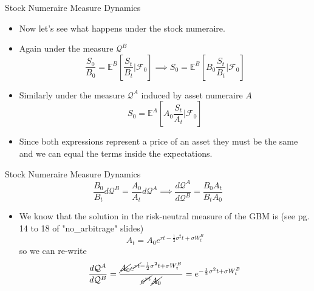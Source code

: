 \documentclass{beamer}
\begin{document}
\begin{frame}{Stock Numeraire Measure Dynamics}
	\begin{itemize}
	\item Now let's see what happens under the stock numeraire.
	\item Again under the measure $\mathcal{Q}^B$
	\begin{equation*}
	\frac{S_0}{B_0} = \mathbb{E}^B\left[\frac{S_t}{B_t}\bigg|\mathcal{F}_0\right] \implies
	S_0 = \mathbb{E}^B\left[B_0\frac{S_t}{B_t}\bigg|\mathcal{F}_0\right]
	\end{equation*}
	\item Similarly under the measure $\mathcal{Q}^A$ induced by asset numeraire $A$
	\begin{equation*}
	S_0 = \mathbb{E}^A\left[A_0\frac{S_t}{A_t}\bigg|\mathcal{F}_0\right]
	\end{equation*}
	\item Since both expressions represent a price of an asset they must be the same and we can equal the terms inside the expectations.
\end{itemize}
\end{frame}

\begin{frame}{Stock Numeraire Measure Dynamics}
	\begin{equation*}
	\frac{B_0}{B_t}d\mathcal{Q}^B = \frac{A_0}{A_t}d\mathcal{Q}^A\implies \frac{d\mathcal{Q}^A}{d\mathcal{Q}^B}=\frac{B_0A_t}{B_tA_0}
	\end{equation*}
	\begin{itemize}
	\item We know that the solution in the risk-neutral measure of the GBM is (see pg. 14 to 18 of "no\_arbitrage" slides)
	\begin{equation*} 
	A_t = A_0 e^{rt-\frac{1}{2}\sigma^2 t + \sigma W^B_t}
	\end{equation*}
	so we can re-write
	\begin{equation*}
	\frac{d\mathcal{Q}^A}{d\mathcal{Q}^B}=\frac{\cancel{A_0}e^{\cancel{rt}-\frac{1}{2}\sigma^2 t + \sigma W^B_t}}{\cancel{e^{rt}}\cancel{A_0}}=e^{-\frac{1}{2}\sigma^2 t + \sigma W^B_t}
	\end{equation*}
\end{itemize}
\end{frame}
\end{document}
